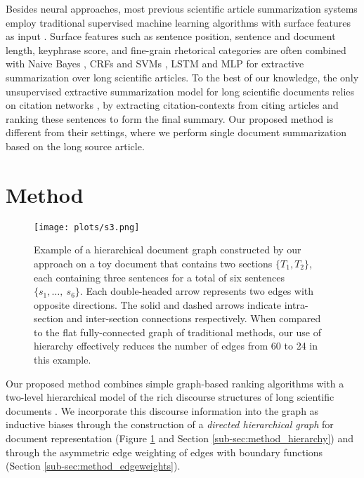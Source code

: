 \documentclass[11pt,a4paper]{article}
\begin{document}
Besides neural approaches, most previous scientific article summarization systems employ traditional supervised machine learning algorithms with surface features as input \citep{xiao2019extractive}. Surface features such as sentence position, sentence and document length, keyphrase score, and fine-grain rhetorical categories are often combined with Naive Bayes \citep{teufel2002summarizing}, CRFs
and SVMs \citep{liakata-etal-2013-discourse}, LSTM and MLP \citep{collins2017supervised} for extractive summarization over long scientific articles. To the best of our knowledge, the only unsupervised extractive summarization model for long scientific documents relies on citation networks \citep{qazvinian-2008-citation-network, cohan-goharian-2015-scientific}, by extracting citation-contexts from citing articles and ranking these sentences to form the final summary. Our proposed method is different from their settings, where we perform single document summarization based on the long source article.




\section{Method}
\begin{figure}[t]
    \centering
    \texttt{[image: plots/s3.png]}
    \caption{Example of a hierarchical document graph constructed by our approach on a toy document that contains two sections $\{T_1, T_2\}$, each containing three sentences for a total of six sentences $\{s_1, \ldots,\ s_6\}.$ Each double-headed arrow represents two edges with opposite directions. The solid and dashed arrows indicate intra-section and inter-section connections respectively. When compared to the flat fully-connected graph of traditional methods, our use of hierarchy effectively reduces the number of edges from 60 to 24 in this example. 
    }
    \label{fig:hierarchy}
\end{figure}

Our proposed method combines simple graph-based ranking algorithms with a two-level hierarchical model of the rich discourse structures of long scientific documents \citep{teufel1997sentence,xiao2019extractive}. We incorporate this discourse information into the graph as inductive biases through the construction of a \textit{directed hierarchical graph} for document representation (Figure \ref{fig:hierarchy} and Section \ref{sub-sec:method_hierarchy}) and through the asymmetric edge weighting of edges with boundary functions (Section \ref{sub-sec:method_edgeweights}). 
\end{document}
